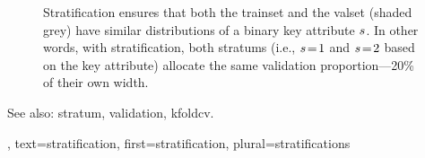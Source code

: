 {{\begin{figure}[H]
 		\caption{Stratification ensures that both the \gls{trainset} and the \gls{valset} 
			(shaded grey) have similar distributions of a binary key attribute $s$. 
			In other words, with stratification, both \glspl{stratum}  
			(i.e., $s\!=\!1$ and $s\!=\!2$ based on the key attribute) 
			allocate the same \gls{validation} proportion—20\% of their own width. \label{fig_stratification_dict}}
 		\end{figure}
  		See also: \gls{stratum}, \gls{validation}, \gls{kfoldcv}.},
  	text={stratification},
  	first={stratification},
  	plural={stratifications}
}

